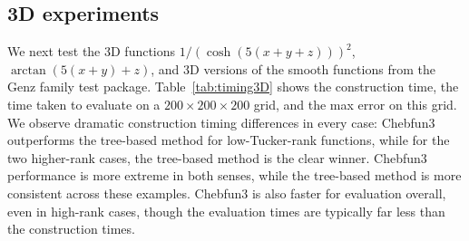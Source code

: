 

\subsection{3D experiments}

We next test the 3D functions $1/(\cosh(5(x+y+z)))^2$, $\arctan(5(x+y)+z)$, and 3D versions of the smooth functions from the Genz family test package. Table~\ref{tab:timing3D} shows the construction time, the time taken to evaluate on a $200\times 200 \times 200$ grid, and the max error on this grid. We observe dramatic construction timing differences in every case: Chebfun3 outperforms the tree-based method for low-Tucker-rank functions, while for the two higher-rank cases, the tree-based method is the clear winner. Chebfun3 performance is more extreme in both senses, while the tree-based method is more consistent across these examples. Chebfun3 is also faster for evaluation overall, even in high-rank cases, though the evaluation times are typically far less than the construction times. 


